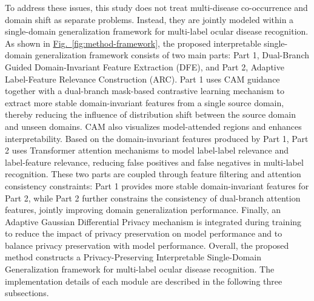 To address these issues, this study does not treat multi-disease co-occurrence and domain shift as separate problems. Instead, they are jointly modeled within a single-domain generalization framework for multi-label ocular disease recognition. As shown in \hyperref[fig:method-framework]{Fig.~\ref*{fig:method-framework}}, the proposed interpretable single-domain generalization framework consists of two main parts: Part 1, Dual-Branch Guided Domain-Invariant Feature Extraction (DFE), and Part 2, Adaptive Label-Feature Relevance Construction (ARC). Part 1 uses CAM guidance together with a dual-branch mask-based contrastive learning mechanism to extract more stable domain-invariant features from a single source domain, thereby reducing the influence of distribution shift between the source domain and unseen domains. CAM also visualizes model-attended regions and enhances interpretability. Based on the domain-invariant features produced by Part 1, Part 2 uses Transformer attention mechanisms to model label-label relevance and label-feature relevance, reducing false positives and false negatives in multi-label recognition. These two parts are coupled through feature filtering and attention consistency constraints: Part 1 provides more stable domain-invariant features for Part 2, while Part 2 further constrains the consistency of dual-branch attention features, jointly improving domain generalization performance. Finally, an Adaptive Gaussian Differential Privacy mechanism is integrated during training to reduce the impact of privacy preservation on model performance and to balance privacy preservation with model performance. Overall, the proposed method constructs a Privacy-Preserving Interpretable Single-Domain Generalization framework for multi-label ocular disease recognition. The implementation details of each module are described in the following three subsections.

